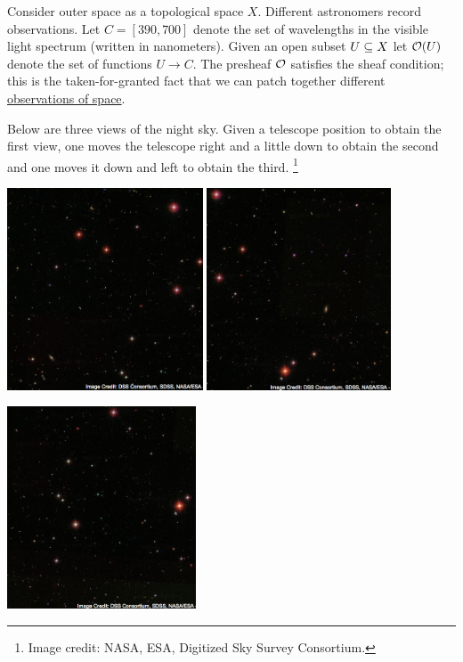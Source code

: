 \documentclass[CT4S-EN-RU]{subfiles}
\begin{document}
\begin{application}

Consider outer space as a topological space $X$. Different astronomers record observations. Let $C=[390,700]$ denote the set of wavelengths in the visible light spectrum (written in nanometers). Given an open subset $U\ss X$ let $\mcO(U)$ denote the set of functions $U\to C$. The presheaf $\mcO$ satisfies the sheaf condition; this is the taken-for-granted fact that we can patch together different \href{http://en.wikipedia.org/wiki/Astrophotography}{\text observations of space}.

Below are three views of the night sky. Given a telescope position to obtain the first view, one moves the telescope right and a little down to obtain the second and one moves it down and left to obtain the third.
\footnote{Image credit: NASA, ESA, Digitized Sky Survey Consortium.}
\begin{center}\parbox{5.5in}{\begin{center}
\includegraphics[height=6cm]{Sky1}\hsp
\includegraphics[height=6cm]{Sky2}\end{center}
\hspace{1.8in}
\includegraphics[height=6cm]{Sky3}}\end{center}

\end{application}
\end{document}
